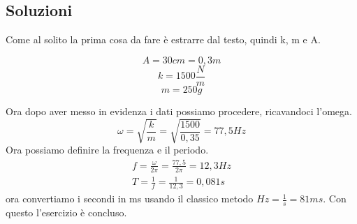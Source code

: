 \subsection{Soluzioni}
Come al solito la prima cosa da fare è estrarre dal testo, quindi k, m e A.
\begin{multicols}{2}
	\begin{equation*}
		A=30cm=0,3m
	\end{equation*}
	\begin{equation*}
		k=1500\frac{N}{m}
	\end{equation*}
	\begin{equation*}
		m=250g
	\end{equation*}
\end{multicols}
Ora dopo aver messo in evidenza i dati possiamo procedere, ricavandoci l'omega.
\begin{equation*}
	\omega=\sqrt{\frac{k}{m}}=\sqrt{\frac{1500}{0,35}}=77,5Hz
\end{equation*}
Ora possiamo definire la frequenza e il periodo.
\begin{equation*}
	\boxed{
		\begin{matrix}
			f=\frac{\omega}{2\pi}=\frac{77,5}{2\pi}=12,3Hz\\
			T=\frac{1}{f}=\frac{1}{12,3}=0,081s
		\end{matrix}
	}
\end{equation*}
ora convertiamo i secondi in ms usando il classico metodo
$Hz=\frac{1}{s}=81ms$.
Con questo l'esercizio è concluso.

